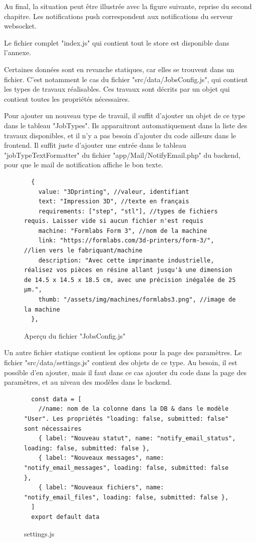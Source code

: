 \documentclass[
    iai, %
    eai, %
]{heig-tb}
\begin{document}
Au final, la situation peut être illustrée avec la figure suivante, reprise du second chapitre.
Les notifications push correspondent aux notifications du serveur websocket.

Le fichier complet "index.js" qui contient tout le store est disponible dans l'annexe.

Certaines données sont en revanche statiques, car elles se trouvent dans un fichier. C'est notamment le cas du fichier "src/data/JobsConfig.js", qui contient les types de travaux réalisables. Ces travaux sont décrits par un objet qui contient toutes les propriétés nécessaires.

\newpage
Pour ajouter un nouveau type de travail, il suffit d'ajouter un objet de ce type dans le tableau "JobTypes". Ils apparaitront automatiquement dans la liste des travaux disponibles, et il n'y a pas besoin d'ajouter du code ailleurs dans le frontend. Il suffit juste d'ajouter une entrée dans le tableau "jobTypeTextFormatter" du fichier "app/Mail/NotifyEmail.php" du backend, pour que le mail de notification affiche le bon texte.

\begin{figure}[h]
  \begin{verbatim}
  {
    value: "3Dprinting", //valeur, identifiant
    text: "Impression 3D", //texte en français
    requirements: ["step", "stl"], //types de fichiers requis. Laisser vide si aucun fichier n'est requis
    machine: "Formlabs Form 3", //nom de la machine
    link: "https://formlabs.com/3d-printers/form-3/", //lien vers le fabriquant/machine
    description: "Avec cette imprimante industrielle, réalisez vos pièces en résine allant jusqu'à une dimension de 14.5 x 14.5 x 18.5 cm, avec une précision inégalée de 25 μm.",
    thumb: "/assets/img/machines/formlabs3.png", //image de la machine
  },
  \end{verbatim}
  \caption{Aperçu du fichier "JobsConfig.js"}
\end{figure}

Un autre fichier statique contient les options pour la page des paramètres. Le fichier "src/data/settings.js" contient des objets de ce type. Au besoin, il est possible d'en ajouter, mais il faut dans ce cas ajouter du code dans la page des paramètres, et au niveau des modèles dans le backend.

\begin{figure}[h]
  \begin{verbatim}
  const data = [
    //name: nom de la colonne dans la DB & dans le modèle "User". Les propriétés "loading: false, submitted: false" sont nécessaires
    { label: "Nouveau statut", name: "notify_email_status", loading: false, submitted: false },
    { label: "Nouveaux messages", name: "notify_email_messages", loading: false, submitted: false },
    { label: "Nouveaux fichiers", name: "notify_email_files", loading: false, submitted: false },
  ]
  export default data
  \end{verbatim}
  \caption{settings.js}
\end{figure}
\end{document}
